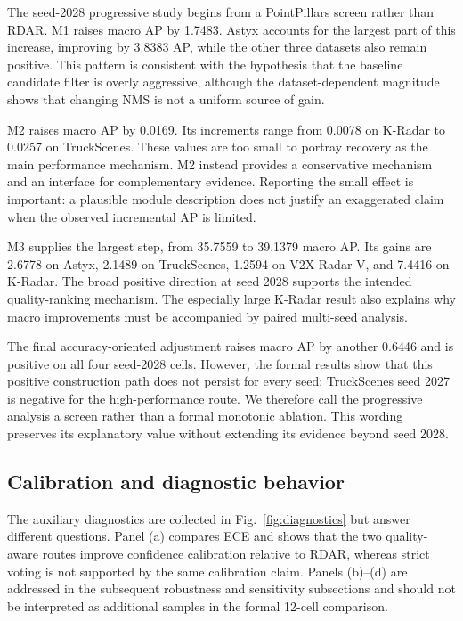 \documentclass[preprint,12pt,times]{elsarticle}
\newcommand{\figref}[1]{\textcolor{floatreviewblue}{Fig.~\ref{#1}}}
\newcommand{\figref}[1]{Fig.~\ref{#1}}
\begin{document}
The seed-2028 progressive study begins from a PointPillars
screen rather than RDAR. M1 raises macro AP by 1.7483. Astyx accounts for the
largest part of this increase, improving by 3.8383 AP, while the other three
datasets also remain positive. This pattern is consistent with the hypothesis
that the baseline candidate filter is overly aggressive, although the
dataset-dependent magnitude shows that changing NMS is not a uniform source of
gain.

M2 raises macro AP by 0.0169. Its increments range from 0.0078 on K-Radar to
0.0257 on TruckScenes. These values are too small to portray recovery as the
main performance mechanism. M2 instead provides a conservative mechanism and
an interface for complementary evidence. Reporting the small effect is
important: a plausible module description does not justify an exaggerated
claim when the observed incremental AP is limited.

M3 supplies the largest step, from 35.7559 to 39.1379 macro AP. Its gains are
2.6778 on Astyx, 2.1489 on TruckScenes, 1.2594 on V2X-Radar-V, and 7.4416 on
K-Radar. The broad positive direction at seed 2028 supports the intended
quality-ranking mechanism. The especially large K-Radar result also explains
why macro improvements must be accompanied by paired multi-seed analysis.

The final accuracy-oriented adjustment raises macro AP by another 0.6446 and
is positive on all four seed-2028 cells. However, the formal results show that
this positive construction path does not persist for every seed: TruckScenes
seed 2027 is negative for the high-performance route. We therefore call
the progressive analysis a screen rather than a formal monotonic
ablation. This wording preserves its explanatory value without extending its
evidence beyond seed 2028.

\subsection{Calibration and diagnostic behavior}
\label{sec:calibration}

The auxiliary diagnostics are collected in \figref{fig:diagnostics} but answer
different questions. Panel (a) compares ECE and shows that the two
quality-aware routes improve confidence calibration relative to RDAR, whereas
strict voting is not supported by the same calibration claim. Panels (b)--(d)
are addressed in the subsequent robustness and sensitivity subsections and
should not be interpreted as additional samples in the formal 12-cell
comparison.
\end{document}
